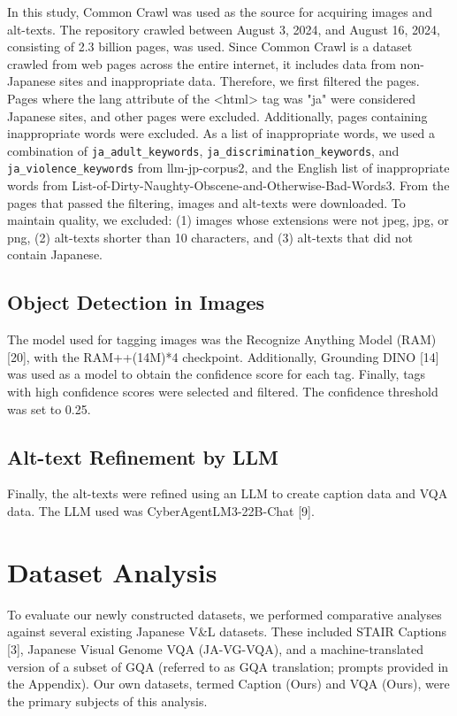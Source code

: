 \documentclass[11pt]{article}
\begin{document}
In this study, Common Crawl was used as the source for acquiring images and alt-texts. The repository crawled between August 3, 2024, and August 16, 2024, consisting of 2.3 billion pages, was used.
Since Common Crawl is a dataset crawled from web pages across the entire internet, it includes data from non-Japanese sites and inappropriate data. Therefore, we first filtered the pages. Pages where the lang attribute of the <html> tag was "ja" were considered Japanese sites, and other pages were excluded. Additionally, pages containing inappropriate words were excluded. As a list of inappropriate words, we used a combination of \verb|ja_adult_keywords|, \verb|ja_discrimination_keywords|, and \verb|ja_violence_keywords| from llm-jp-corpus2, and the English list of inappropriate words from List-of-Dirty-Naughty-Obscene-and-Otherwise-Bad-Words3.
From the pages that passed the filtering, images and alt-texts were downloaded. To maintain quality, we excluded: (1) images whose extensions were not jpeg, jpg, or png, (2) alt-texts shorter than 10 characters, and (3) alt-texts that did not contain Japanese.

\subsection{Object Detection in Images}

The model used for tagging images was the Recognize Anything Model (RAM) [20], with the RAM++(14M)*4 checkpoint. Additionally, Grounding DINO [14] was used as a model to obtain the confidence score for each tag.
Finally, tags with high confidence scores were selected and filtered. The confidence threshold was set to 0.25.

\subsection{Alt-text Refinement by LLM}

Finally, the alt-texts were refined using an LLM to create caption data and VQA data. The LLM used was CyberAgentLM3-22B-Chat [9].

\section{Dataset Analysis}
To evaluate our newly constructed datasets, we performed comparative analyses against several existing Japanese V\&L datasets. These included STAIR Captions [3], Japanese Visual Genome VQA (JA-VG-VQA), and a machine-translated version of a subset of GQA (referred to as GQA translation; prompts provided in the Appendix). Our own datasets, termed Caption (Ours) and VQA (Ours), were the primary subjects of this analysis.
\end{document}
